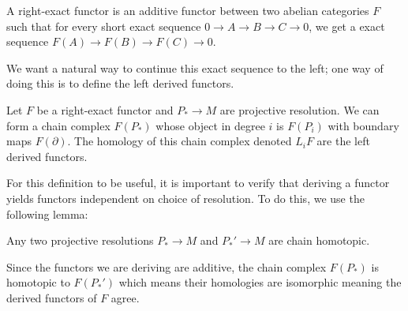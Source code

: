 \begin{definition} A right-exact functor is an additive functor
between two abelian categories $F$ such that for every short
exact sequence $0\rightarrow A\rightarrow B\rightarrow
C\rightarrow 0$, we get a exact sequence $F(A)\rightarrow
F(B)\rightarrow F(C)\rightarrow 0$.
\end{definition}
We want a natural way to continue this exact sequence to the
left; one way of doing this is to define the left derived
functors.
\begin{definition} Let $F$ be a right-exact functor and
$P_*\rightarrow M$ are projective resolution. We can form a
chain complex $F(P_*)$ whose object in degree $i$ is $F(P_i)$
with boundary maps $F(\partial)$. The homology of this chain
complex denoted $L_iF$ are the left derived functors.
\end{definition}

For this definition to be useful, it is important to verify that
deriving a functor yields functors independent on choice of
resolution. To do this, we use the following lemma:

\begin{lemma} Any two projective resolutions $P_*\rightarrow M$
and $P_*'\rightarrow M$ are chain homotopic. \end{lemma}
\begin{corollary}Since the functors we are deriving are
additive, the chain complex $F(P_*)$ is homotopic to $F(P_*')$
which means their homologies are isomorphic meaning the derived
functors of $F$ agree.\end{corollary}

